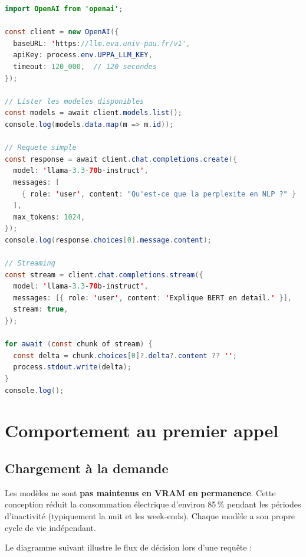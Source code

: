 \documentclass[12pt, a4paper, twoside]{article}
\begin{document}
\begin{lstlisting}[language=java, basicstyle=\ttfamily\small, backgroundcolor=\color{codebg},
  frame=single, framerule=0.4pt, rulecolor=\color{coderule}, breaklines=true,
  xleftmargin=6pt, xrightmargin=6pt, aboveskip=6pt, belowskip=4pt,
  caption={Client JavaScript complet avec streaming}]
import OpenAI from 'openai';

const client = new OpenAI({
  baseURL: 'https://llm.eva.univ-pau.fr/v1',
  apiKey: process.env.UPPA_LLM_KEY,
  timeout: 120_000,  // 120 secondes
});

// Lister les modeles disponibles
const models = await client.models.list();
console.log(models.data.map(m => m.id));

// Requete simple
const response = await client.chat.completions.create({
  model: 'llama-3.3-70b-instruct',
  messages: [
    { role: 'user', content: "Qu'est-ce que la perplexite en NLP ?" }
  ],
  max_tokens: 1024,
});
console.log(response.choices[0].message.content);

// Streaming
const stream = client.chat.completions.stream({
  model: 'llama-3.3-70b-instruct',
  messages: [{ role: 'user', content: 'Explique BERT en detail.' }],
  stream: true,
});

for await (const chunk of stream) {
  const delta = chunk.choices[0]?.delta?.content ?? '';
  process.stdout.write(delta);
}
console.log();
\end{lstlisting}

\section{Comportement au premier appel}
\label{sec:premier-appel}

\subsection{Chargement à la demande}

Les modèles ne sont \textbf{pas maintenus en VRAM en permanence}. Cette conception réduit
la consommation électrique d'environ 85\,\% pendant les périodes d'inactivité (typiquement
la nuit et les week-ends). Chaque modèle a son propre cycle de vie indépendant.

Le diagramme suivant illustre le flux de décision lors d'une requête :
\end{document}
